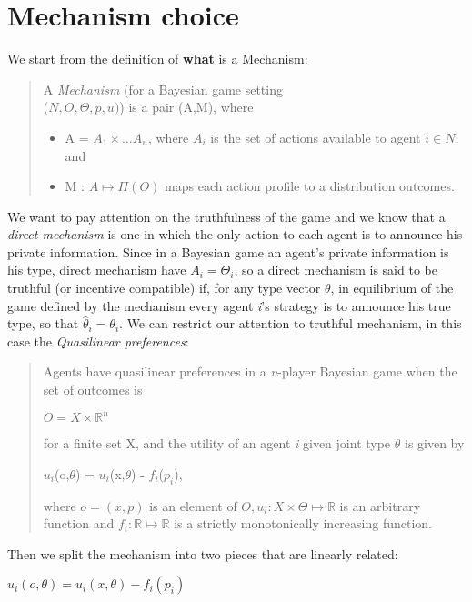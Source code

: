 \documentclass{article}
\begin{document}
\section{Mechanism choice}
\Large{
We start from the definition of \textbf{what} is a Mechanism:
\begin{quote}
    A \textit{Mechanism} (for a Bayesian game setting\\ ($N,O,\Theta,p,u)$) is a pair (A,M), where
    \begin{itemize}
        \item A = $A_1 \times \dots A_n$, where $A_i$ is the set of actions available to agent $i \in N$; and
        \item M : $A \mapsto \Pi(O)$ maps each action profile to a distribution outcomes.
    \end{itemize}
\end{quote}
We want to pay attention on the truthfulness of the game and we know that a \textit{direct mechanism} is one in which the only action to each agent is to announce his private information. Since in a Bayesian game an agent's private information is his type, direct mechanism have $A_i = \Theta_i$, so a direct mechanism is said to be truthful (or incentive compatible) if, for any type vector $\theta$, in equilibrium of the game defined by the mechanism every agent \textit{i}'s strategy is to announce his true type, so that $\hat{\theta}_i = \theta_i$. We can restrict our attention to truthful mechanism, in this case the \textit{Quasilinear preferences}:
\begin{quote}
    Agents have quasilinear preferences in a \textit{n}-player Bayesian game when the set of outcomes is
    \begin{center}
        $O = X \times \mathbb{R}^n$
    \end{center}
    for a finite set X, and the utility of an agent \textit{i} given joint type $\theta$ is given by
    \begin{center}
        $u_i$(o,$\theta$) = $u_i$(x,$\theta$) - $f_i$($p_i$),
    \end{center}
    where $o = (x,p)$ is an element of $O, u_i : X \times \Theta \mapsto \mathbb{R}$ is an arbitrary function  and $f_i : \mathbb{R} \mapsto \mathbb{R}$ is a strictly monotonically increasing function.
\end{quote}
Then we split the mechanism into two pieces that are linearly related:
\begin{center}
    $u_i(o,\theta) = u_i(x,\theta) - f_i(p_i)$
    \begin{itemize}

\end{itemize}
\end{center}}
\end{document}
